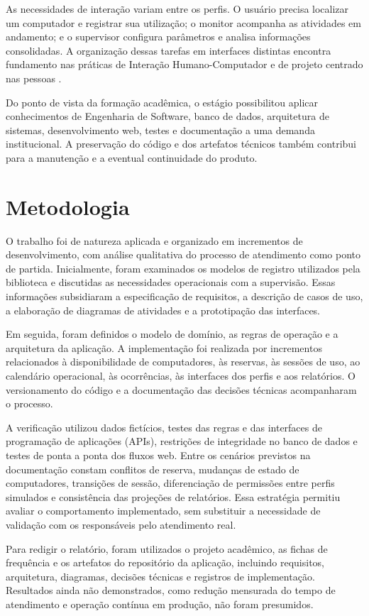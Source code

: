 As necessidades de interação variam entre os perfis. O usuário precisa localizar um computador e registrar sua utilização; o monitor acompanha as atividades em andamento; e o supervisor configura parâmetros e analisa informações consolidadas. A organização dessas tarefas em interfaces distintas encontra fundamento nas práticas de Interação Humano-Computador e de projeto centrado nas pessoas \cite{barbosaSilva2010,iso9241_210_2019}.

Do ponto de vista da formação acadêmica, o estágio possibilitou aplicar conhecimentos de Engenharia de Software, banco de dados, arquitetura de sistemas, desenvolvimento web, testes e documentação a uma demanda institucional. A preservação do código e dos artefatos técnicos também contribui para a manutenção e a eventual continuidade do produto.

\section{Metodologia}\label{sec:metodologia}

O trabalho foi de natureza aplicada e organizado em incrementos de desenvolvimento, com análise qualitativa do processo de atendimento como ponto de partida. Inicialmente, foram examinados os modelos de registro utilizados pela biblioteca e discutidas as necessidades operacionais com a supervisão. Essas informações subsidiaram a especificação de requisitos, a descrição de casos de uso, a elaboração de diagramas de atividades e a prototipação das interfaces.

Em seguida, foram definidos o modelo de domínio, as regras de operação e a arquitetura da aplicação. A implementação foi realizada por incrementos relacionados à disponibilidade de computadores, às reservas, às sessões de uso, ao calendário operacional, às ocorrências, às interfaces dos perfis e aos relatórios. O versionamento do código e a documentação das decisões técnicas acompanharam o processo.

A verificação utilizou dados fictícios, testes das regras e das interfaces de programação de aplicações (APIs), restrições de integridade no banco de dados e testes de ponta a ponta dos fluxos web. Entre os cenários previstos na documentação constam conflitos de reserva, mudanças de estado de computadores, transições de sessão, diferenciação de permissões entre perfis simulados e consistência das projeções de relatórios. Essa estratégia permitiu avaliar o comportamento implementado, sem substituir a necessidade de validação com os responsáveis pelo atendimento real.

Para redigir o relatório, foram utilizados o projeto acadêmico, as fichas de frequência e os artefatos do repositório da aplicação, incluindo requisitos, arquitetura, diagramas, decisões técnicas e registros de implementação. Resultados ainda não demonstrados, como redução mensurada do tempo de atendimento e operação contínua em produção, não foram presumidos.

